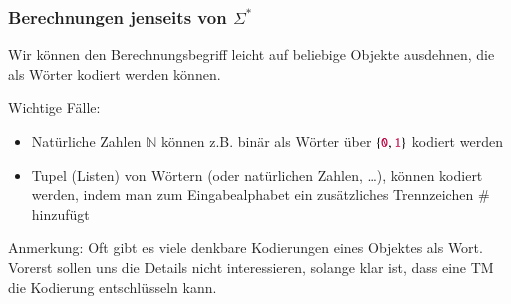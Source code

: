 \documentclass[onlymath]{beamer}
\begin{document}
\begin{frame}\frametitle{Berechnungen jenseits von $\Sigma^*$}

\pause
Wir können den Berechnungsbegriff leicht auf beliebige Objekte ausdehnen, die als
Wörter kodiert werden können.
\bigskip

Wichtige Fälle:
\begin{itemize}
\item \alert{Natürliche Zahlen $\mathbb{N}$} können z.B. binär als Wörter über $\{\mathtt{\textcolor{purple}{0}},\mathtt{\textcolor{purple}{1}}\}$ kodiert werden
\item \alert{Tupel} (Listen) von Wörtern (oder natürlichen Zahlen, \ldots), können kodiert werden, indem man zum Eingabealphabet ein zusätzliches Trennzeichen $\#$ hinzufügt
\end{itemize}\bigskip\pause

\medskip

Anmerkung: Oft gibt es viele denkbare Kodierungen eines Objektes als Wort. Vorerst sollen uns die Details nicht interessieren, solange klar ist, dass eine TM die Kodierung entschlüsseln kann.


\end{frame}
\end{document}
